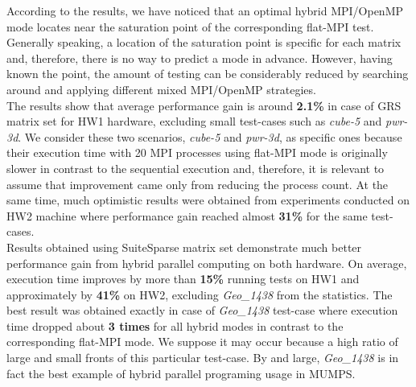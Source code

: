 
According to the results, we have noticed that an optimal hybrid MPI/OpenMP mode locates near the saturation point of the corresponding flat-MPI test. Generally speaking, a location of the saturation point is specific for each matrix and, therefore, there is no way to predict a mode in advance. However, having known the point, the amount of testing can be considerably reduced by searching around and applying different mixed MPI/OpenMP strategies.\\


The results show that average performance gain is around \textbf{2.1\%} in case of GRS matrix set for HW1 hardware, excluding small test-cases such as \textit{cube-5} and \textit{pwr-3d}. We consider these two scenarios, \textit{cube-5} and \textit{pwr-3d}, as specific ones because their execution time with 20 MPI processes using flat-MPI mode is originally slower in contrast to the sequential execution and, therefore, it is relevant to assume that improvement came only from reducing the process count. At the same time, much optimistic results were obtained from experiments conducted on HW2 machine where performance gain reached almost \textbf{31\%} for the same test-cases.\\



Results obtained using SuiteSparse matrix set demonstrate much better performance gain from hybrid parallel computing on both hardware. On average, execution time improves by more than \textbf{15\%} running tests on HW1 and approximately by \textbf{41\%} on HW2, excluding \textit{Geo\_1438} from the statistics. The best result was obtained exactly in case of \textit{Geo\_1438} test-case where execution time dropped about \textbf{3 times} for all hybrid modes in contrast to the corresponding flat-MPI mode. We suppose it may occur because a high ratio of large and small fronts of this particular test-case. By and large, \textit{Geo\_1438} is in fact the best example of hybrid parallel programing usage in MUMPS.\\


